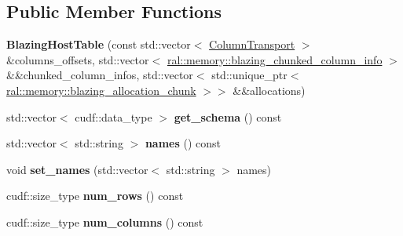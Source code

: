 \subsection*{Public Member Functions}
\begin{DoxyCompactItemize}
\item 
\mbox{\label{classral_1_1frame_1_1BlazingHostTable_ad61570c773d3d83c788d1a66ef657b1f}} 
{\bfseries Blazing\+Host\+Table} (const std\+::vector$<$ \hyperlink{structblazingdb_1_1transport_1_1ColumnTransport}{Column\+Transport} $>$ \&columns\+\_\+offsets, std\+::vector$<$ \hyperlink{structral_1_1memory_1_1blazing__chunked__column__info}{ral\+::memory\+::blazing\+\_\+chunked\+\_\+column\+\_\+info} $>$ \&\&chunked\+\_\+column\+\_\+infos, std\+::vector$<$ std\+::unique\+\_\+ptr$<$ \hyperlink{structral_1_1memory_1_1blazing__allocation__chunk}{ral\+::memory\+::blazing\+\_\+allocation\+\_\+chunk} $>$$>$ \&\&allocations)
\item 
\mbox{\label{classral_1_1frame_1_1BlazingHostTable_a81bf7375e4c76c00615a141243edd891}} 
std\+::vector$<$ cudf\+::data\+\_\+type $>$ {\bfseries get\+\_\+schema} () const
\item 
\mbox{\label{classral_1_1frame_1_1BlazingHostTable_afc36b1cebafd2be252e1fe86f358c047}} 
std\+::vector$<$ std\+::string $>$ {\bfseries names} () const
\item 
\mbox{\label{classral_1_1frame_1_1BlazingHostTable_ad48051c54ff7a7bce9261fcd58f1815c}} 
void {\bfseries set\+\_\+names} (std\+::vector$<$ std\+::string $>$ names)
\item 
\mbox{\label{classral_1_1frame_1_1BlazingHostTable_a8c79df309ba2224a497e3ff26d22c399}} 
cudf\+::size\+\_\+type {\bfseries num\+\_\+rows} () const
\item 
\mbox{\label{classral_1_1frame_1_1BlazingHostTable_a7d1f2bc7f684b2494f54af56fac94555}} 
cudf\+::size\+\_\+type {\bfseries num\+\_\+columns} () const
\item 
\mbox{\label{classral_1_1frame_1_1BlazingHostTable_a55117c800b864710d6ebcc72cfec23fc}} 
$$
\end{DoxyCompactItemize}
